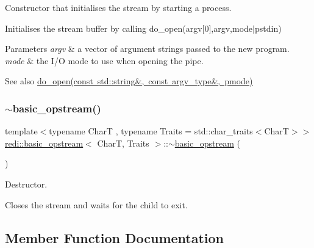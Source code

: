 Constructor that initialises the stream by starting a process. 

Initialises the stream buffer by calling {\ttfamily do\+\_\+open}(argv\mbox{[}0\mbox{]},argv,mode$\vert$pstdin)


\begin{DoxyParams}{Parameters}
{\em argv} & a vector of argument strings passed to the new program. \\
\hline
{\em mode} & the I/O mode to use when opening the pipe. \\
\hline
\end{DoxyParams}
\begin{DoxySeeAlso}{See also}
\mbox{\hyperlink{classredi_1_1pstream__common_a352b77fa600f7ebe0d8f1582be05ae4d}{do\+\_\+open(const std\+::string\&, const argv\+\_\+type\&, pmode)}} 
\end{DoxySeeAlso}
\mbox{\label{classredi_1_1basic__opstream_ab66a34987ca0dd5b1a60e21ac9b396d0}} 
\subsubsection{\texorpdfstring{$\sim$basic\+\_\+opstream()}{~basic\_opstream()}}
{\footnotesize\ttfamily template$<$typename CharT , typename Traits  = std\+::char\+\_\+traits$<$\+Char\+T$>$$>$ \\
\mbox{\hyperlink{classredi_1_1basic__opstream}{redi\+::basic\+\_\+opstream}}$<$ CharT, Traits $>$\+::$\sim$\mbox{\hyperlink{classredi_1_1basic__opstream}{basic\+\_\+opstream}} (\begin{DoxyParamCaption}{ }\end{DoxyParamCaption})\hspace{0.3cm}{\ttfamily [inline]}}



Destructor. 

Closes the stream and waits for the child to exit. 

\subsection{Member Function Documentation}
\mbox{\label{classredi_1_1basic__opstream_ad7a0f17e3b135712a40f55868aaee1f6}} 
